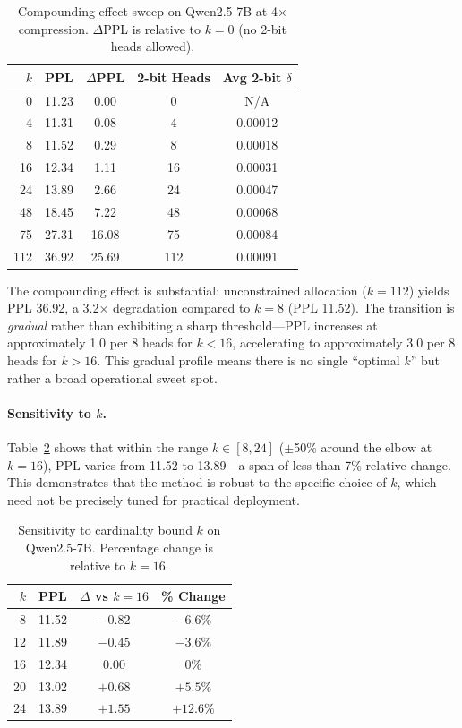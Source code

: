\documentclass[11pt,a4paper]{article}
\begin{document}
\begin{table}[t]
\centering
\small
\caption{Compounding effect sweep on Qwen2.5-7B at 4$\times$ compression. $\Delta$PPL is relative to $k{=}0$ (no 2-bit heads allowed).}
\label{tab:compounding}
\begin{tabular}{rcccc}
\toprule
\textbf{$k$} & \textbf{PPL} & \textbf{$\Delta$PPL} & \textbf{2-bit Heads} & \textbf{Avg 2-bit $\delta$} \\
\midrule
0   & 11.23 &  0.00 &   0 & N/A \\
4   & 11.31 &  0.08 &   4 & 0.00012 \\
8   & 11.52 &  0.29 &   8 & 0.00018 \\
16  & 12.34 &  1.11 &  16 & 0.00031 \\
24  & 13.89 &  2.66 &  24 & 0.00047 \\
48  & 18.45 &  7.22 &  48 & 0.00068 \\
75  & 27.31 & 16.08 &  75 & 0.00084 \\
112 & 36.92 & 25.69 & 112 & 0.00091 \\
\bottomrule
\end{tabular}
\end{table}

The compounding effect is substantial: unconstrained allocation ($k{=}112$) yields PPL 36.92, a 3.2$\times$ degradation compared to $k{=}8$ (PPL 11.52).
The transition is \emph{gradual} rather than exhibiting a sharp threshold---PPL increases at approximately 1.0 per 8 heads for $k < 16$, accelerating to approximately 3.0 per 8 heads for $k > 16$.
This gradual profile means there is no single ``optimal $k$'' but rather a broad operational sweet spot.

\paragraph{Sensitivity to $k$.}
Table~\ref{tab:sensitivity_k} shows that within the range $k \in [8, 24]$ ($\pm$50\% around the elbow at $k{=}16$), PPL varies from 11.52 to 13.89---a span of less than 7\% relative change.
This demonstrates that the method is robust to the specific choice of $k$, which need not be precisely tuned for practical deployment.

\begin{table}[t]
\centering
\small
\caption{Sensitivity to cardinality bound $k$ on Qwen2.5-7B. Percentage change is relative to $k{=}16$.}
\label{tab:sensitivity_k}
\begin{tabular}{rccc}
\toprule
\textbf{$k$} & \textbf{PPL} & \textbf{$\Delta$ vs $k{=}16$} & \textbf{\% Change} \\
\midrule
8  & 11.52 & $-0.82$ & $-6.6\%$ \\
12 & 11.89 & $-0.45$ & $-3.6\%$ \\
16 & 12.34 &  0.00  & $0\%$ \\
20 & 13.02 & $+0.68$ & $+5.5\%$ \\
24 & 13.89 & $+1.55$ & $+12.6\%$ \\
\bottomrule
\end{tabular}
\end{table}
\end{document}
